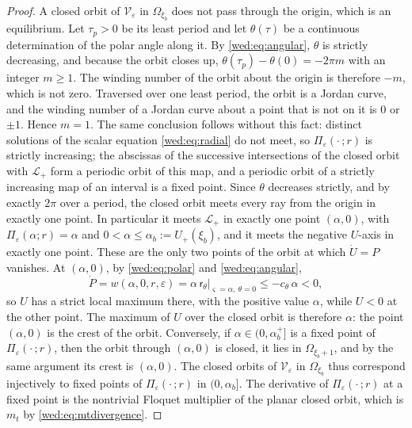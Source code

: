\begin{proof}
A closed orbit of $\mathcal V_\varepsilon$ in $\Omega_{\xi_b}$ does not pass through the origin, which is an equilibrium. Let $\tau_p>0$ be its least period and let $\theta(\tau)$ be a continuous determination of the polar angle along it. By \eqref{wed:eq:angular}, $\theta$ is strictly decreasing, and because the orbit closes up, $\theta(\tau_p)-\theta(0)=-2\pi m$ with an integer $m\ge1$. The winding number of the orbit about the origin is therefore $-m$, which is not zero. Traversed over one least period, the orbit is a Jordan curve, and the winding number of a Jordan curve about a point that is not on it is $0$ or $\pm1$. Hence $m=1$. The same conclusion follows without this fact: distinct solutions of the scalar equation \eqref{wed:eq:radial} do not meet, so $\Pi_\varepsilon(\cdot\,;r)$ is strictly increasing; the abscissas of the successive intersections of the closed orbit with $\mathcal L_+$ form a periodic orbit of this map, and a periodic orbit of a strictly increasing map of an interval is a fixed point. Since $\theta$ decreases strictly, and by exactly $2\pi$ over a period, the closed orbit meets every ray from the origin in exactly one point. In particular it meets $\mathcal L_+$ in exactly one point $(\alpha,0)$, with $\Pi_\varepsilon(\alpha;r)=\alpha$ and $0<\alpha\le\alpha_b:=U_+(\xi_b)$, and it meets the negative $U$-axis in exactly one point. These are the only two points of the orbit at which $\dot U=P$ vanishes. At $(\alpha,0)$, by \eqref{wed:eq:polar} and \eqref{wed:eq:angular},
\begin{equation}\label{wed:eq:crestsign}
\dot P=w(\alpha,0,r,\varepsilon)=\alpha\,\mathsf r_\theta\big|_{\varsigma=\alpha,\ \theta=0}\le-c_\theta\,\alpha<0,
\end{equation}
so $U$ has a strict local maximum there, with the positive value $\alpha$, while $U<0$ at the other point. The maximum of $U$ over the closed orbit is therefore $\alpha$: the point $(\alpha,0)$ is the crest of the orbit. Conversely, if $\alpha\in(0,\alpha_b^+]$ is a fixed point of $\Pi_\varepsilon(\cdot\,;r)$, then the orbit through $(\alpha,0)$ is closed, it lies in $\Omega_{\xi_b+1}$, and by the same argument its crest is $(\alpha,0)$. The closed orbits of $\mathcal V_\varepsilon$ in $\Omega_{\xi_b}$ thus correspond injectively to fixed points of $\Pi_\varepsilon(\cdot\,;r)$ in $(0,\alpha_b]$. The derivative of $\Pi_\varepsilon(\cdot\,;r)$ at a fixed point is the nontrivial Floquet multiplier of the planar closed orbit, which is $m_t$ by \eqref{wed:eq:mtdivergence}.


\end{proof}
